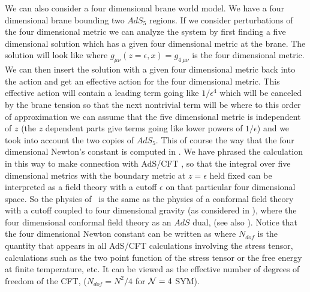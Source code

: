 
We can also consider a four dimensional brane world model. 
We have a four dimensional brane bounding two $AdS_5$ regions. 
If we consider perturbations of the four dimensional metric we
can analyze the system by first finding a five dimensional solution
which has a given four dimensional metric at the brane. The solution
will look like
\eqn{}
where $g_{\mu\nu}(z=\epsilon,x) = g_{4~\mu\nu}$ is the four dimensional
metric. We can then insert the solution with a given four dimensional
metric back  into the action and get an effective action for the 
four dimensional metric. This effective action will contain a leading 
term going like $1/\epsilon^4$ which will be canceled by the brane
tension so that the next nontrivial term will be 
\eqn{}
where to this order of approximation we can assume that the five 
dimensional metric is independent of $z$ (the $z$ dependent parts give
terms going like lower powers of $1/\epsilon$) and we took  into 
account the two copies of $AdS_5$.    
This of course the way that the four dimensional Newton's constant is 
computed in \rs. 
We have phrased the calculation in this way to make connection with
AdS/CFT , so that the integral over five dimensional 
metrics with the boundary metric at $z=\epsilon$ held fixed 
can be interpreted 
as a field theory with a cutoff $\epsilon$ on that particular four 
dimensional space. So the physics of \rs\ is the same as the physics
of a conformal field theory with a cutoff coupled to four dimensional
gravity (as considered in \vf ), where the four dimensional conformal
field theory as an $AdS$ dual, (see also ).
Notice that the four dimensional Newton constant can be written as 
\eqn{}
where $N_{dof}$ is the quantity that appears in all AdS/CFT calculations
involving the stress tensor, calculations such as the two point
function of the stress tensor or the free energy at finite temperature,
etc. It can be viewed as the effective number of degrees of freedom
of the CFT, ($N_{dof} = N^2/4$ for ${\cal N} = 4 $ SYM).
